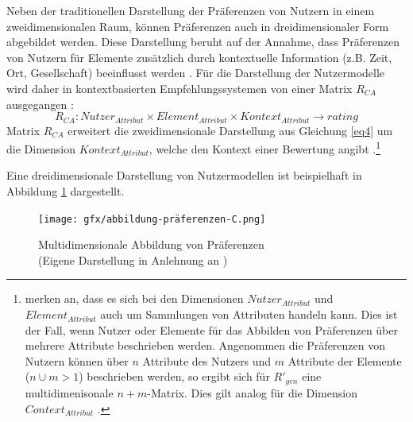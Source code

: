 Neben der traditionellen Darstellung der Präferenzen von Nutzern in einem zweidimensionalen Raum, können Präferenzen auch in dreidimensionaler Form abgebildet werden.
Diese Darstellung beruht auf der Annahme, dass Präferenzen von Nutzern für Elemente zusätzlich durch kontextuelle Information (z.B. Zeit, Ort, Gesellschaft) beeinflusst werden \cite[S. 195]{adomavicius:3:inbook}.
Für die Darstellung der Nutzermodelle wird daher in kontextbasierten Empfehlungssystemen von einer Matrix $R_{CA}$ ausgegangen \cite[S. 254]{berkovsky:article}:
\begin{equation}\label{eq9}
    R_{CA}: Nutzer_{Attribut} \times Element_{Attribut} \times Kontext_{Attribut} \rightarrow rating
\end{equation}
Matrix $R_{CA}$ erweitert die zweidimensionale Darstellung aus Gleichung \ref{eq4} um die Dimension $Kontext_{Attribut}$, welche den Kontext einer Bewertung angibt \cite[S. 254]{berkovsky:article}.\footnote{\textcite[S. 249ff.]{berkovsky:article} merken an, dass es sich bei den Dimensionen $Nutzer_{Attribut}$ und $Element_{Attribut}$ auch um Sammlungen von Attributen handeln kann. Dies ist der Fall, wenn Nutzer oder Elemente für das Abbilden von Präferenzen über mehrere Attribute beschrieben werden. Angenommen die Präferenzen von Nutzern können über $n$ Attribute des Nutzers und $m$ Attribute der Elemente ($n \cup m > 1$) beschrieben werden, so ergibt sich für $R'_{gen}$ eine multidimenisonale $n+m$-Matrix. Dies gilt analog für die Dimension $Context_{Attribut}$ \cite[S. 254f.]{berkovsky:article}.}

Eine dreidimensionale Darstellung von Nutzermodellen ist beispielhaft in Abbildung \ref{fig:empfehlungssysteme:preferences:abb1:3} dargestellt.

\begin{figure}[H]
    \centering
	\texttt{[image: gfx/abbildung-präferenzen-C.png]}
	\caption[Multidimensionale Abbildung von Präferenzen]{Multidimensionale Abbildung von Präferenzen\\
    (Eigene Darstellung in Anlehnung an \cite[S. 198]{adomavicius:3:inbook})}
	\label{fig:empfehlungssysteme:preferences:abb1:3}
\end{figure}

